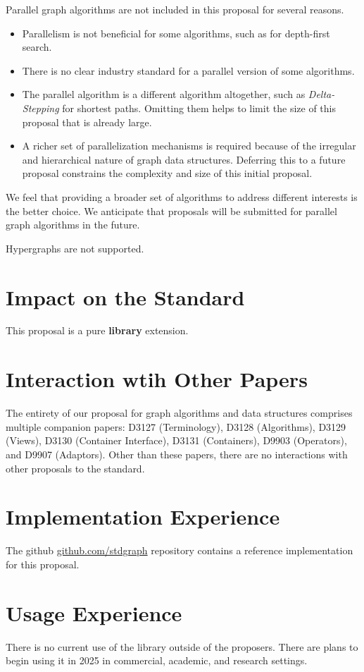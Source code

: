 Parallel graph algorithms are not included in this proposal for several reasons.
\begin{itemize}
      \item Parallelism is not beneficial for some algorithms, such as for depth-first search.
      \item There is no clear industry standard for a parallel version of some algorithms.
      \item The parallel algorithm is a different algorithm altogether, such as \textit{Delta-Stepping} for shortest paths. 
            Omitting them helps to limit the size of this proposal that is already large.
      \item A richer set of parallelization mechanisms is required because of the irregular and hierarchical nature of graph 
            data structures. Deferring this to a future proposal constrains the complexity and size of this initial proposal.
\end{itemize}
We feel that providing a broader set of algorithms to address different interests is the better choice. 
We anticipate that proposals will be submitted for parallel graph algorithms in the future. 

Hypergraphs are not supported.

\section{Impact on the Standard}
This proposal is a pure \textbf{library} extension.

\section{Interaction wtih Other Papers}
The entirety of our proposal for graph algorithms and data structures comprises multiple companion papers: D3127 (Terminology), D3128 (Algorithms), D3129 (Views), D3130 (Container Interface), D3131 (Containers), D9903 (Operators), and D9907 (Adaptors).
Other than these papers, there are no interactions with other proposals to the standard.

\section{Implementation Experience}
The github \href{https://github.com/stdgraph}{github.com/stdgraph} repository contains a reference implementation for this proposal.

\section{Usage Experience}
There is no current use of the library outside of the proposers. There are plans to begin using it in 2025 in commercial, academic, and research settings.

